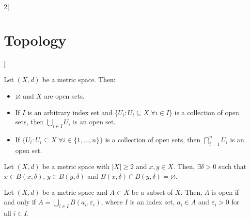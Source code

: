 \documentclass[../../../main.tex]{subfiles}
\begin{document}
\begin{multicols}{2}[\section{Topology}]
  \begin{prop}
    Let $(X,d)$ be a metric space. Then:
    \begin{itemize}
      \item $\varnothing$ and $X$ are open sets.
      \item If $I$ is an arbitrary index set and $\{U_i:U_i\subseteq X\;\forall i\in I\}$ is a collection of open sets, then $\bigcup_{i\in I}U_i$ is an open set.
      \item If $\{U_i:U_i\subseteq X\;\forall i\in \{1,\ldots,n\}\}$ is a collection of open sets, then $\bigcap_{i=1}^nU_i$ is an open set.
    \end{itemize}
  \end{prop}
  \begin{prop}
    Let $(X,d)$ be a metric space with $|X|\geq 2$ and $x,y\in X$. Then, $\exists\delta>0$ such that $x\in B(x,\delta)$, $y\in B(y,\delta)$ and $B(x,\delta)\cap B(y,\delta)=\varnothing$.
  \end{prop}
  \begin{prop}
    Let $(X,d)$ be a metric space and $A\subset X$ be a subset of $X$. Then, $A$ is open if and only if $A=\bigcup_{i\in I}B(a_i,\varepsilon_i)$, where $I$ is an index set, $a_i\in A$ and $\varepsilon_i>0$ for all $i\in I$.
  \end{prop}

\end{multicols}
\end{document}
